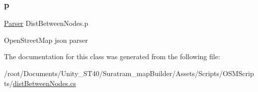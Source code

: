 \subsubsection{\texorpdfstring{p}{p}}
{\footnotesize\ttfamily \hyperlink{classParser}{Parser} Dist\+Between\+Nodes.\+p\hspace{0.3cm}{\ttfamily [protected]}}



Open\+Street\+Map json parser



The documentation for this class was generated from the following file\+:\begin{DoxyCompactItemize}
\item 
/root/\+Documents/\+Unity\+\_\+\+S\+T40/\+Suratram\+\_\+map\+Builder/\+Assets/\+Scripts/\+O\+S\+M\+Scripts/\hyperlink{distBetweenNodes_8cs}{dist\+Between\+Nodes.\+cs}\end{DoxyCompactItemize}
